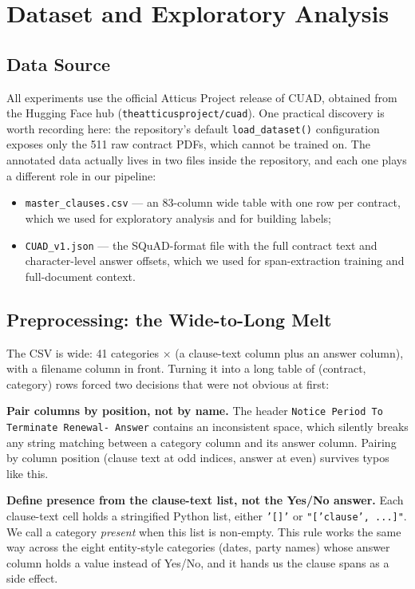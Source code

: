 \chapter{Dataset and Exploratory Analysis}

\section{Data Source}
All experiments use the official Atticus Project release of CUAD, obtained from the Hugging Face hub (\texttt{theatticusproject/cuad}). One practical discovery is worth recording here: the repository's default \texttt{load\_dataset()} configuration exposes only the 511 raw contract PDFs, which cannot be trained on. The annotated data actually lives in two files inside the repository, and each one plays a different role in our pipeline:
\begin{itemize}[itemsep=2pt]
  \item \texttt{master\_clauses.csv} --- an 83-column wide table with one row per contract, which we used for exploratory analysis and for building labels;
  \item \texttt{CUAD\_v1.json} --- the SQuAD-format file with the full contract text and character-level answer offsets, which we used for span-extraction training and full-document context.
\end{itemize}

\section{Preprocessing: the Wide-to-Long Melt}
The CSV is wide: 41 categories $\times$ (a clause-text column plus an answer column), with a filename column in front. Turning it into a long table of (contract, category) rows forced two decisions that were not obvious at first:

\textbf{Pair columns by position, not by name.} The header \texttt{Notice Period To Terminate Renewal- Answer} contains an inconsistent space, which silently breaks any string matching between a category column and its answer column. Pairing by column position (clause text at odd indices, answer at even) survives typos like this.

\textbf{Define presence from the clause-text list, not the Yes/No answer.} Each clause-text cell holds a stringified Python list, either \texttt{'[]'} or \texttt{"['clause', ...]"}. We call a category \emph{present} when this list is non-empty. This rule works the same way across the eight entity-style categories (dates, party names) whose answer column holds a value instead of Yes/No, and it hands us the clause spans as a side effect.

